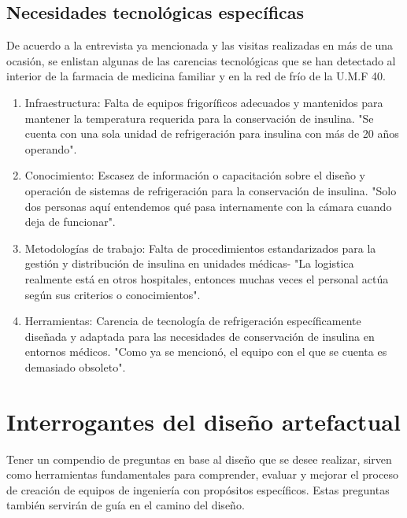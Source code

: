 \subsection{Necesidades tecnológicas específicas}
De acuerdo a la entrevista ya mencionada y las visitas realizadas en más de una ocasión, se enlistan algunas de las carencias tecnológicas que se han detectado al interior de la farmacia de medicina familiar y en la red de frío de la U.M.F 40.
\begin{enumerate}
\item Infraestructura: Falta de equipos frigoríficos adecuados y mantenidos para mantener la temperatura requerida para la conservación de insulina. "Se cuenta con una sola unidad de refrigeración para insulina con más de 20 años operando".  
\item Conocimiento: Escasez de información o capacitación sobre el diseño y operación de sistemas de refrigeración para la conservación de insulina. "Solo dos personas aquí entendemos qué pasa internamente con la cámara cuando deja de funcionar". 
\item Metodologías de trabajo: Falta de procedimientos estandarizados para la gestión y distribución de insulina en unidades médicas- "La logistica realmente está en otros hospitales, entonces muchas veces el personal actúa según sus criterios o conocimientos". \cite{david-umf}
\item Herramientas: Carencia de tecnología de refrigeración específicamente diseñada y adaptada para las necesidades de conservación de insulina en entornos médicos. "Como ya se mencionó, el equipo con el que se cuenta es demasiado obsoleto". \cite{david-umf}

\end{enumerate}\rsp
\section{Interrogantes del diseño artefactual}\rsp
Tener un compendio de preguntas en base al diseño que se desee realizar, sirven como herramientas fundamentales para comprender, evaluar y mejorar el proceso de creación de equipos de ingeniería con propósitos específicos. Estas preguntas también servirán de guía en el camino del diseño.\\[-1cm]

